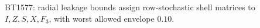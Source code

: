 \begin{center}\small
BT1577: radial leakage bounds assign row-stochastic shell matrices to $I,Z,S,X,F_3$, with worst allowed envelope $0.10$.
\end{center}
